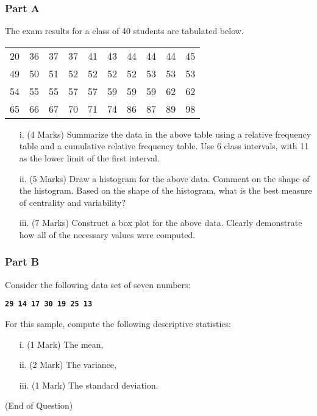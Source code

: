 \documentclass[a4paper,12pt]{article}
\begin{document}
\subsubsection*{Part A} %
The exam results for a class of 40 students are tabulated below.
\begin{table}[ht]
\begin{center}
\begin{tabular}{|rrrrrrrrrr|}
\hline
 20 & 36 & 37 & 37 & 41 & 43 & 44 & 44 & 44 & 45 \\
 49 & 50 & 51 & 52 & 52 & 52 & 52 & 53 & 53 & 53 \\
 54 & 55 & 55 & 57 & 57 & 59 & 59 & 59 & 62 & 62 \\
 65 & 66 & 67 & 70 & 71 & 74 & 86 & 87 & 89 & 98 \\

\hline
\end{tabular}
\end{center}
\end{table}
\vspace{-0.5cm}
\begin{itemize}
\item[i.] (4 Marks) Summarize the data in the above table using a relative frequency table and a cumulative relative frequency table. Use 6 class intervals, with 11 as the lower limit of the first interval.
\item[ii.] (5 Marks) Draw a histogram for the above data. Comment on the shape of the histogram. Based on the shape of the histogram, what is the best measure of centrality and variability?
\item[iii.] (7 Marks) Construct a box plot for the above data. Clearly demonstrate how all of the necessary values were computed.
\end{itemize}

\vspace{0.25cm}
\subsubsection*{Part B} %
Consider the following data set of seven numbers:

\begin{center}
\textbf{\texttt{29 14 17 30 19 25 13}}
\end{center}

\noindent For this sample, compute the following descriptive statistics:
\begin{itemize}
\item[i.] (1 Mark) The mean,
\item[ii.] (2 Mark) The variance,
\item[iii.] (1 Mark) The standard deviation.
\end{itemize}
(End of Question)
\newpage
\end{document}
